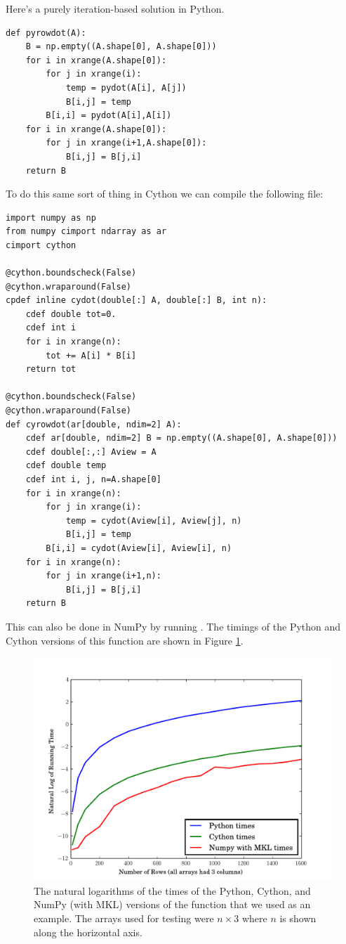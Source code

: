 Here's a purely iteration-based solution in Python.
\begin{lstlisting}
def pyrowdot(A):
    B = np.empty((A.shape[0], A.shape[0]))
    for i in xrange(A.shape[0]):
        for j in xrange(i):
            temp = pydot(A[i], A[j])
            B[i,j] = temp
        B[i,i] = pydot(A[i],A[i])
    for i in xrange(A.shape[0]):
        for j in xrange(i+1,A.shape[0]):
            B[i,j] = B[j,i]
    return B
\end{lstlisting}

To do this same sort of thing in Cython we can compile the following file:

\begin{lstlisting}
import numpy as np
from numpy cimport ndarray as ar
cimport cython

@cython.boundscheck(False)
@cython.wraparound(False)
cpdef inline cydot(double[:] A, double[:] B, int n):
    cdef double tot=0.
    cdef int i
    for i in xrange(n):
        tot += A[i] * B[i]
    return tot

@cython.boundscheck(False)
@cython.wraparound(False)
def cyrowdot(ar[double, ndim=2] A):
    cdef ar[double, ndim=2] B = np.empty((A.shape[0], A.shape[0]))
    cdef double[:,:] Aview = A
    cdef double temp
    cdef int i, j, n=A.shape[0]
    for i in xrange(n):
        for j in xrange(i):
            temp = cydot(Aview[i], Aview[j], n)
            B[i,j] = temp
        B[i,i] = cydot(Aview[i], Aview[i], n)
    for i in xrange(n):
        for j in xrange(i+1,n):
            B[i,j] = B[j,i]
    return B
\end{lstlisting}

This can also be done in NumPy by running .
The timings of the Python and Cython versions of this function are shown in Figure \ref{cython:rowdot}.

\begin{figure}
\includegraphics[width=\textwidth]{rowdot.pdf}
\caption{
The natural logarithms of the times of the Python, Cython, and NumPy (with MKL) versions of the  function that we used as an example.
The arrays used for testing were $n\times 3$ where $n$ is shown along the horizontal axis.
}
\label{cython:rowdot}
\end{figure}

